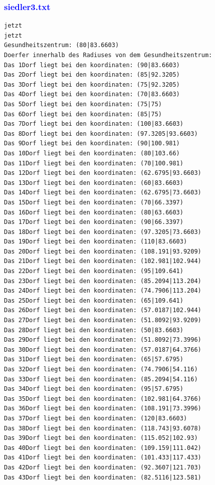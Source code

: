 \documentclass{article}
\begin{document}
\subsubsection{\textcolor{blue}{siedler3.txt}}
\begin{verbatim}
jetzt
jetzt
Gesundheitszentrum: (80|83.6603)
Doerfer innerhalb des Radiuses von dem Gesundheitszentrum: 
Das 1Dorf liegt bei den koordinaten: (90|83.6603)
Das 2Dorf liegt bei den koordinaten: (85|92.3205)
Das 3Dorf liegt bei den koordinaten: (75|92.3205)
Das 4Dorf liegt bei den koordinaten: (70|83.6603)
Das 5Dorf liegt bei den koordinaten: (75|75)
Das 6Dorf liegt bei den koordinaten: (85|75)
Das 7Dorf liegt bei den koordinaten: (100|83.6603)
Das 8Dorf liegt bei den koordinaten: (97.3205|93.6603)
Das 9Dorf liegt bei den koordinaten: (90|100.981)
Das 10Dorf liegt bei den koordinaten: (80|103.66)
Das 11Dorf liegt bei den koordinaten: (70|100.981)
Das 12Dorf liegt bei den koordinaten: (62.6795|93.6603)
Das 13Dorf liegt bei den koordinaten: (60|83.6603)
Das 14Dorf liegt bei den koordinaten: (62.6795|73.6603)
Das 15Dorf liegt bei den koordinaten: (70|66.3397)
Das 16Dorf liegt bei den koordinaten: (80|63.6603)
Das 17Dorf liegt bei den koordinaten: (90|66.3397)
Das 18Dorf liegt bei den koordinaten: (97.3205|73.6603)
Das 19Dorf liegt bei den koordinaten: (110|83.6603)
Das 20Dorf liegt bei den koordinaten: (108.191|93.9209)
Das 21Dorf liegt bei den koordinaten: (102.981|102.944)
Das 22Dorf liegt bei den koordinaten: (95|109.641)
Das 23Dorf liegt bei den koordinaten: (85.2094|113.204)
Das 24Dorf liegt bei den koordinaten: (74.7906|113.204)
Das 25Dorf liegt bei den koordinaten: (65|109.641)
Das 26Dorf liegt bei den koordinaten: (57.0187|102.944)
Das 27Dorf liegt bei den koordinaten: (51.8092|93.9209)
Das 28Dorf liegt bei den koordinaten: (50|83.6603)
Das 29Dorf liegt bei den koordinaten: (51.8092|73.3996)
Das 30Dorf liegt bei den koordinaten: (57.0187|64.3766)
Das 31Dorf liegt bei den koordinaten: (65|57.6795)
Das 32Dorf liegt bei den koordinaten: (74.7906|54.116)
Das 33Dorf liegt bei den koordinaten: (85.2094|54.116)
Das 34Dorf liegt bei den koordinaten: (95|57.6795)
Das 35Dorf liegt bei den koordinaten: (102.981|64.3766)
Das 36Dorf liegt bei den koordinaten: (108.191|73.3996)
Das 37Dorf liegt bei den koordinaten: (120|83.6603)
Das 38Dorf liegt bei den koordinaten: (118.743|93.6078)
Das 39Dorf liegt bei den koordinaten: (115.052|102.93)
Das 40Dorf liegt bei den koordinaten: (109.159|111.042)
Das 41Dorf liegt bei den koordinaten: (101.433|117.433)
Das 42Dorf liegt bei den koordinaten: (92.3607|121.703)
Das 43Dorf liegt bei den koordinaten: (82.5116|123.581)

\end{verbatim}
\end{document}
